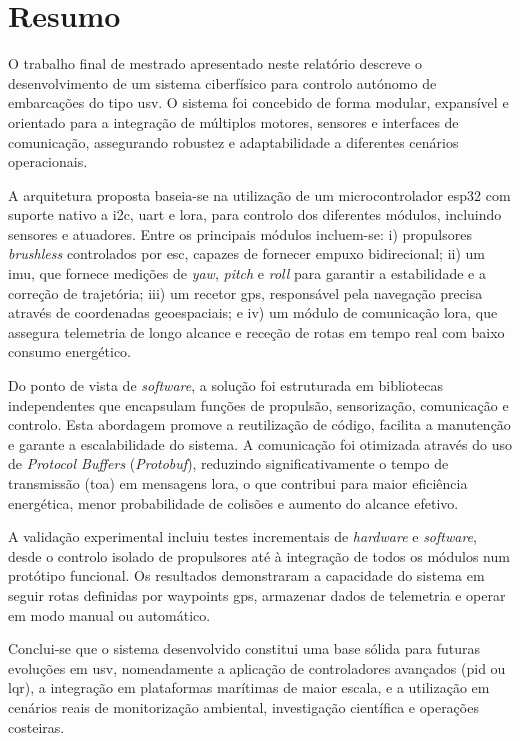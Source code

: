 
\chapter{Resumo}

O trabalho final de mestrado apresentado neste relatório descreve o desenvolvimento de um sistema ciberfísico para controlo autónomo de embarcações do tipo \acrfull{usv}. O sistema foi concebido de forma modular, expansível e orientado para a integração de múltiplos motores, sensores e interfaces de comunicação, assegurando robustez e adaptabilidade a diferentes cenários operacionais.

A arquitetura proposta baseia-se na utilização de um microcontrolador \gls{esp32} com suporte nativo a \gls{i2c}, \gls{uart} e \gls{lora}, para controlo dos diferentes módulos, incluindo sensores e atuadores. Entre os principais módulos incluem-se: i) propulsores \emph{brushless} controlados por \acrfull{esc}, capazes de fornecer empuxo bidirecional; ii) um \acrfull{imu}, que fornece medições de \emph{yaw}, \emph{pitch} e \emph{roll} para garantir a estabilidade e a correção de trajetória; iii) um recetor \acrfull{gps}, responsável pela navegação precisa através de coordenadas geoespaciais; e iv) um módulo de comunicação \acrfull{lora}, que assegura telemetria de longo alcance e receção de rotas em tempo real com baixo consumo energético.

Do ponto de vista de \emph{software}, a solução foi estruturada em bibliotecas independentes que encapsulam funções de propulsão, sensorização, comunicação e controlo. Esta abordagem promove a reutilização de código, facilita a manutenção e garante a escalabilidade do sistema. A comunicação foi otimizada através do uso de \emph{Protocol Buffers} (\emph{Protobuf}), reduzindo significativamente o tempo de transmissão (\gls{toa}) em mensagens \acrfull{lora}, o que contribui para maior eficiência energética, menor probabilidade de colisões e aumento do alcance efetivo.

A validação experimental incluiu testes incrementais de \emph{hardware} e \emph{software}, desde o controlo isolado de propulsores até à integração de todos os módulos num protótipo funcional. Os resultados demonstraram a capacidade do sistema em seguir rotas definidas por waypoints \acrfull{gps}, armazenar dados de telemetria e operar em modo manual ou automático.

Conclui-se que o sistema desenvolvido constitui uma base sólida para futuras evoluções em \acrfull{usv}, nomeadamente a aplicação de controladores avançados (\acrfull{pid} ou \acrfull{lqr}), a integração em plataformas marítimas de maior escala, e a utilização em cenários reais de monitorização ambiental, investigação científica e operações costeiras.

\vspace{-0.5cm}
